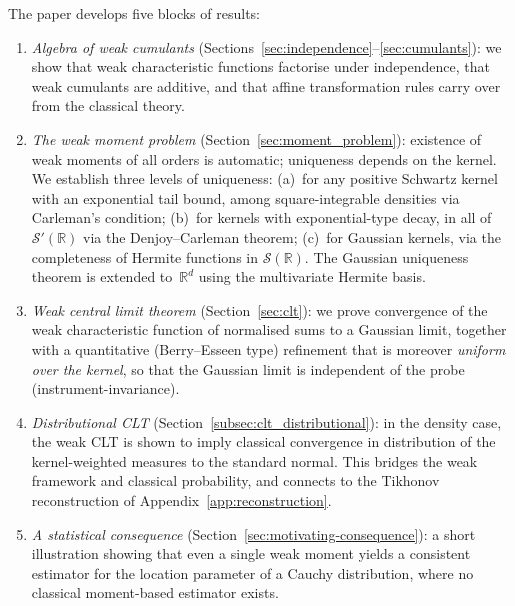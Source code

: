 \documentclass[12pt]{article}
\theoremstyle{definition}
\newcommand{\R}{\mathbb{R}}
\newcommand{\pulo}{\vspace{0.2cm}}
\begin{document}
\pulo

 \noindent
The paper develops five blocks of results:
\begin{enumerate}[label=(\roman*)]
\item \emph{Algebra of weak cumulants} (Sections~\ref{sec:independence}--\ref{sec:cumulants}): we show that weak characteristic functions factorise under independence, that weak cumulants are additive, and that affine transformation rules carry over from the classical theory.
\item \emph{The weak moment problem} (Section~\ref{sec:moment_problem}): existence of weak moments of all orders is automatic; uniqueness depends on the kernel.  We establish three levels of uniqueness: (a)~for any positive Schwartz kernel with an exponential tail bound, among square-integrable densities via Carleman's condition; (b)~for kernels with exponential-type decay, in all of $\mathcal{S}'(\R)$ via the Denjoy--Carleman theorem; (c)~for Gaussian kernels, via the completeness of Hermite functions in $\mathcal{S}(\R)$.  The Gaussian uniqueness theorem is extended to~$\R^d$ using the multivariate Hermite basis.
\item \emph{Weak central limit theorem} (Section~\ref{sec:clt}): we prove convergence of the weak characteristic function of normalised sums to a Gaussian limit, together with a quantitative (Berry--Esseen type) refinement that is moreover \emph{uniform over the kernel}, so that the Gaussian limit is independent of the probe (instrument-invariance).
\item \emph{Distributional CLT} (Section~\ref{subsec:clt_distributional}): in the density case, the weak CLT is shown to imply classical convergence in distribution of the kernel-weighted measures to the standard normal.  This bridges the weak framework and classical probability, and connects to the Tikhonov reconstruction of Appendix~\ref{app:reconstruction}.
\item \emph{A statistical consequence} (Section~\ref{sec:motivating-consequence}): a short illustration showing that even a single weak moment yields a consistent estimator for the location parameter of a Cauchy distribution, where no classical moment-based estimator exists.
\end{enumerate}
\end{document}
